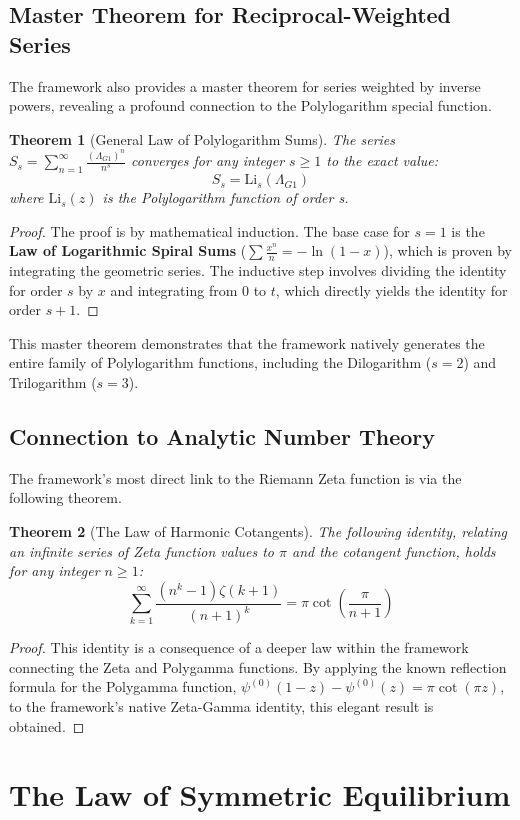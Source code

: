 \documentclass[12pt, letterpaper]{article}
\newtheorem{theorem}{Theorem}[section]
\newcommand{\LambdaG}{\Lambda_{G1}}
\begin{document}
\subsection{Master Theorem for Reciprocal-Weighted Series}
The framework also provides a master theorem for series weighted by inverse powers, revealing a profound connection to the Polylogarithm special function.
\begin{theorem}[General Law of Polylogarithm Sums]
The series $S_s = \sum_{n=1}^{\infty} \frac{(\LambdaG)^{n}}{n^s}$ converges for any integer $s \ge 1$ to the exact value: $$S_s = \mathrm{Li}_s(\LambdaG)$$ where $\mathrm{Li}_s(z)$ is the Polylogarithm function of order s.
\end{theorem}
\begin{proof}
The proof is by mathematical induction. The base case for $s=1$ is the \textbf{Law of Logarithmic Spiral Sums} ($\sum \frac{x^n}{n} = -\ln(1-x)$), which is proven by integrating the geometric series. The inductive step involves dividing the identity for order $s$ by $x$ and integrating from $0$ to $t$, which directly yields the identity for order $s+1$.
\end{proof}
This master theorem demonstrates that the framework natively generates the entire family of Polylogarithm functions, including the Dilogarithm ($s=2$) and Trilogarithm ($s=3$).

\subsection{Connection to Analytic Number Theory}
The framework's most direct link to the Riemann Zeta function is via the following theorem.
\begin{theorem}[The Law of Harmonic Cotangents]
The following identity, relating an infinite series of Zeta function values to $\pi$ and the cotangent function, holds for any integer $n\ge1$:
$$\sum_{k=1}^{\infty}\frac{(n^{k}-1)\zeta(k+1)}{(n+1)^{k}}=\pi \cot\left(\frac{\pi}{n+1}\right)$$
\end{theorem}
\begin{proof}
This identity is a consequence of a deeper law within the framework connecting the Zeta and Polygamma functions. By applying the known reflection formula for the Polygamma function, $\psi^{(0)}(1-z)-\psi^{(0)}(z)=\pi \cot(\pi z)$, to the framework's native Zeta-Gamma identity, this elegant result is obtained.
\end{proof}

\section{The Law of Symmetric Equilibrium}
\end{document}
